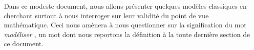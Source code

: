 Dans ce modeste document, nous allons présenter quelques modèles classiques en cherchant surtout à nous interroger sur leur validité du point de vue mathématique. Ceci nous amènera à nous questionner sur la signification du mot \emph{\og modéliser \fg{}} , un mot dont nous reportons la définition à la toute dernière section de ce document.
